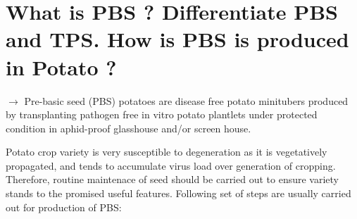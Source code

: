 \documentclass[
]{book}
\begin{document}
\hypertarget{what-is-pbs-differentiate-pbs-and-tps.-how-is-pbs-is-produced-in-potato}{%
\section{What is PBS ? Differentiate PBS and TPS. How is PBS is produced in Potato ?}\label{what-is-pbs-differentiate-pbs-and-tps.-how-is-pbs-is-produced-in-potato}}

\(\longrightarrow\) Pre-basic seed (PBS) potatoes are disease free potato minitubers produced by transplanting pathogen free in vitro potato plantlets under protected condition in aphid-proof glasshouse and/or screen house.

Potato crop variety is very susceptible to degeneration as it is vegetatively propagated, and tends to accumulate virus load over generation of cropping. Therefore, routine maintenace of seed should be carried out to ensure variety stands to the promised useful features. Following set of steps are usually carried out for production of PBS:
\end{document}
